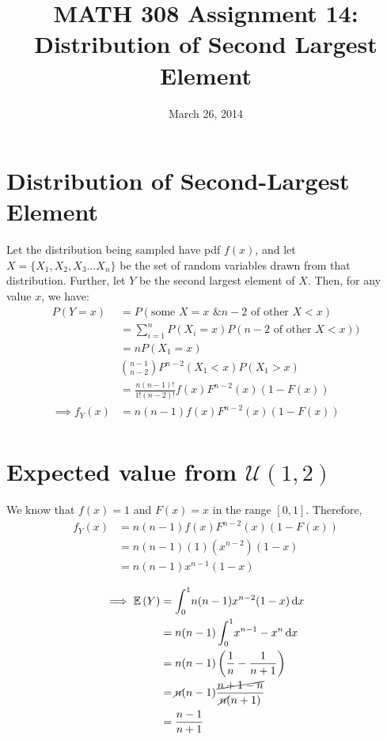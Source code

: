\documentclass[twocolumn]{article}
\title{MATH 308 Assignment 14:\\Distribution of Second Largest Element}
\date{March 26, 2014}
\begin{document}
\maketitle
\section{Distribution of Second-Largest Element}
Let the distribution being sampled have pdf $f(x)$, and let $X=\{X_1,X_2,X_3\ldots X_n\}$ be the set of random variables drawn from that distribution. Further, let $Y$ be the second largest element of $X$. Then, for any value $x$, we have:\begin{align*}
P(Y=x) &= P(\text{some }X=x\text{ \& }n-2\text{ of other }X<x)\\
&= \sum_{i=1}^nP(X_i=x)P(n-2\text{ of other }X<x))\\
&= nP(X_1=x)\\
&\binom{n-1}{n-2}P^{n-2}(X_1<x)P(X_1>x)\\
&= \frac{n(n-1)!}{1!(n-2)!}f(x)F^{n-2}(x)(1-F(x))\\
\implies f_Y(x) &= n(n-1)f(x)F^{n-2}(x)(1-F(x))\\
\end{align*}

\newpage

\section{Expected value from $\mathcal{U}(1,2)$}
We know that $f(x)=1$ and $F(x)=x$ in the range $[0,1]$. Therefore, \begin{align*}
f_Y(x) &= n(n-1)f(x)F^{n-2}(x)(1-F(x))\\
&= n(n-1)(1)(x^{n-2})(1-x)\\
&= n(n-1)x^{n-1}(1-x)\\
\end{align*}
\begin{align*}
\implies \mathbb{E}\left(Y\right)&=\int_{0}^{1} \! n(n-1)x^{n-2}(1-x) \, \mathrm{d} x\\
&= n(n-1)\int_{0}^{1} \! x^{n-1}-x^n \, \mathrm{d} x\\
&= n(n-1)\left(\frac{1}{n}-\frac{1}{n+1}\right)\\
&= \cancel{n}(n-1)\frac{\cancel{n+1-n}}{\cancel{n}(n+1)}\\
&=\frac{n-1}{n+1}
\end{align*}
\end{document}
